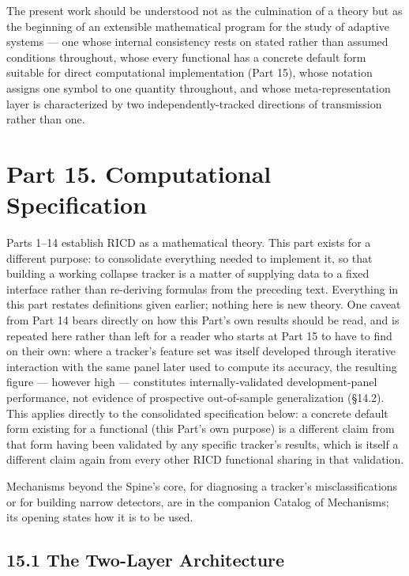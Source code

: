 \documentclass[
]{article}
\begin{document}
The present work should be understood not as the culmination of a theory
but as the beginning of an extensible mathematical program for the study
of adaptive systems --- one whose internal consistency rests on stated
rather than assumed conditions throughout, whose every functional has a
concrete default form suitable for direct computational implementation
(Part 15), whose notation assigns one symbol to one quantity throughout,
and whose meta-representation layer is characterized by two
independently-tracked directions of transmission rather than one.

\hypertarget{part-15.-computational-specification}{%
\section{Part 15. Computational
Specification}\label{part-15.-computational-specification}}

Parts 1--14 establish RICD as a mathematical theory. This part exists
for a different purpose: to consolidate everything needed to implement
it, so that building a working collapse tracker is a matter of supplying
data to a fixed interface rather than re-deriving formulas from the
preceding text. Everything in this part restates definitions given
earlier; nothing here is new theory. One caveat from Part 14 bears
directly on how this Part's own results should be read, and is repeated
here rather than left for a reader who starts at Part 15 to have to find
on their own: where a tracker's feature set was itself developed through
iterative interaction with the same panel later used to compute its
accuracy, the resulting figure --- however high --- constitutes
internally-validated development-panel performance, not evidence of
prospective out-of-sample generalization (§14.2). This applies directly
to the consolidated specification below: a concrete default form
existing for a functional (this Part's own purpose) is a different claim
from that form having been validated by any specific tracker's results,
which is itself a different claim again from every other RICD functional
sharing in that validation.

Mechanisms beyond the Spine's core, for diagnosing a tracker's
misclassifications or for building narrow detectors, are in the
companion Catalog of Mechanisms; its opening states how it is to be
used.

\hypertarget{the-two-layer-architecture}{%
\subsection{15.1 The Two-Layer
Architecture}\label{the-two-layer-architecture}}
\end{document}
